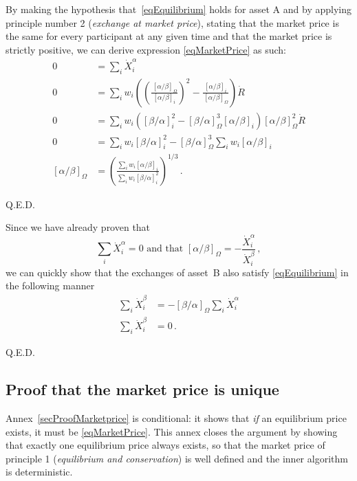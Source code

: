 \documentclass[letterpaper]{article}
\newcommand{\priceAB}{\left[\alpha / \beta\right]}
\newcommand{\priceBA}{\left[\beta / \alpha\right]}
\begin{document}
By making the hypothesis that~\eqref{eqEquilibrium} holds for asset A and by applying principle number 2 (\emph{exchange at market price}), stating that the market price is the same for every participant at any given time and that the market price is strictly positive, we can derive expression \eqref{eqMarketPrice} as such:
\begin{align*}
    0 &= \sum_i \dot{X}_i^\alpha\\
    0 &= \sum_i w_i \left( \left( \frac{\hspace{2pt}\priceAB_\Omega}{\priceAB_i}\right)^2 - \frac{\priceAB_i}{\hspace{2pt}\priceAB_\Omega} \right) \dot{R} \\
    0 &= \sum_i w_i \left( \priceBA_i^2 - \priceBA_\Omega^3 \priceAB_i \right) \priceAB_\Omega^2 \dot{R}\\
    0 &= \sum_i w_i \priceBA_i^2 - \priceBA_\Omega^3 \sum_i w_i \priceAB_i\\
    \priceAB_\Omega &= \left( \frac{\displaystyle \sum_i w_i \priceAB_i}{\displaystyle \sum_i w_i \priceBA_i^2}\right)^{1/3} \,.
\end{align*}
\begin{flushright}
Q.E.D.
\end{flushright}
Since we have already proven that
\begin{equation*}
    \sum_i \dot{X}_i^\alpha = 0 \text{ and that }\priceAB_\Omega = -\frac{\dot{X}_i^\alpha}{\dot{X}_i^\beta}\,,
\end{equation*}
we can quickly show that the exchanges of asset~B also satisfy \eqref{eqEquilibrium} in the following manner
\begin{align*}
    \sum_i \dot{X}_i^\beta &= -\priceBA_\Omega \sum_i \dot{X}_i^\alpha\\
    \sum_i \dot{X}_i^\beta &= 0 \,.
\end{align*}
\begin{flushright}
Q.E.D.
\end{flushright}

\subsection{Proof that the market price is unique}\label{secProofUniqueness}

Annex~\ref{secProofMarketprice} is conditional: it shows that \emph{if} an equilibrium price exists, it must be \eqref{eqMarketPrice}. This annex closes the argument by showing that exactly one equilibrium price always exists, so that the market price of principle 1 (\emph{equilibrium and conservation}) is well defined and the inner algorithm is deterministic.
\end{document}
